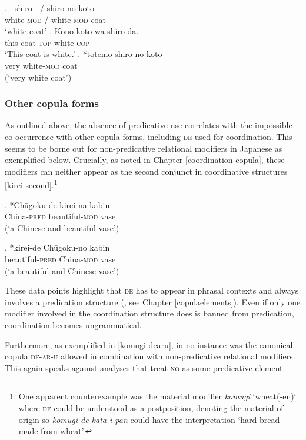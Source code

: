 \documentclass [output=book,colorlinks,citecolor=brown]{langscibook}
\begin{document}
\ex. \ag. shiro-i / shiro-no kōto\\
white-\textsc{mod} / white-\textsc{mod} coat\\
`white coat' \null \hfill \citep{koopman:2016:further}
\bg. Kono kōto-wa shiro-da.\\
this coat-\textsc{top} white-\textsc{cop}\\
`This coat is white.’
\cg. *totemo shiro-no kōto\\
very white-\textsc{mod} coat\\
(`very white coat’) \label{totemoshiro}

\subsubsection{Other copula forms}

As outlined above, the absence of predicative use correlates with the impossible co-occurrence with other copula forms, including \textsc{de} used for coordination. This seems to be borne out for non-predicative relational modifiers in Japanese as exemplified below. Crucially, as noted in Chapter \ref{coordination copula}, these modifiers can neither appear as the second conjunct in coordinative structures \ref{kirei second}.\footnote{One apparent counterexample was the material modifier \textit{komugi} `wheat(-en)‘ where \textsc{de} could be understood as a postposition, denoting the material of origin so \textit{komugi-de kata-i pan} could have the interpretation `hard bread made from wheat'.} %

\exg. *Chūgoku-de kirei-na kabin\\
China-\textsc{pred} beautiful-\textsc{mod} vase\\
(`a Chinese and beautiful vase’)

\exg. *kirei-de Chūgoku-no kabin\\
beautiful-\textsc{pred} China-\textsc{mod} vase\\
(`a beautiful and Chinese vase’) \label{kirei second}

These data points highlight that \textsc{de} has to appear in phrasal contexts and always involves a predication structure (\citealt{bowers:1993:predication}, see Chapter \ref{copulaelements}). Even if only one modifier involved in the coordination structure does is banned from predication, coordination becomes ungrammatical.

Furthermore, as exemplified in \ref{komugi dearu}, in no instance was the canonical copula \textsc{de-ar-u} allowed in combination with non-predicative relational modifiers. This again speaks against analyses that treat \textsc{no} as some predicative element. %
\end{document}
